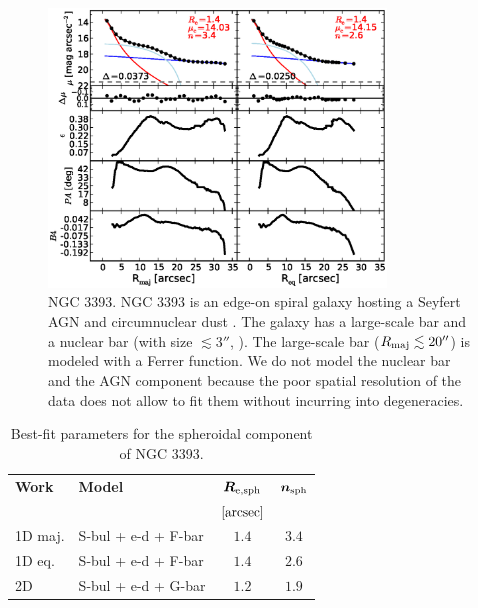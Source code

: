 \documentclass[preprint2]{emulateapj}
\newcommand{\fitfigurewidth}{0.8\textwidth}
\begin{document}
  \begin{figure}[h]
  \begin{center}
  \includegraphics[width=\fitfigurewidth]{images/n3393_1Dfit.eps}
  \caption{NGC 3393.
  NGC 3393 is an edge-on spiral galaxy hosting a Seyfert AGN \citep{diaz1988n3393} and 
  circumnuclear dust \citep{martini2003}.
  The galaxy has a large-scale bar and a nuclear bar (with size $\lesssim 3''$, \citealt{erwin2004}).  
  The large-scale bar ($R_{\rm maj} \lesssim 20''$) is modeled with a Ferrer function.
  We do not model the nuclear bar and the AGN component because the poor spatial resolution of the data does not allow to fit them 
  without incurring into degeneracies.
  }
  \end{center}
  \end{figure}

  \begin{table}[h]
  \small
  \caption{Best-fit parameters for the spheroidal component of NGC 3393.}
  \begin{center}
  \begin{tabular}{llcc}
  \hline
  {\bf Work} & {\bf Model}   & $\bm R_{\rm e,sph}$    & $\bm n_{\rm sph}$ \\
    &  &  $[\rm arcsec]$ & \\
  \hline
  1D maj. & S-bul + e-d + F-bar & $1.4$  &  $3.4$ \\
  1D eq.  & S-bul + e-d + F-bar & $1.4$  &  $2.6$ \\
  2D      & S-bul + e-d + G-bar & $1.2$  &  $1.9$ \\
  \hline
  \end{tabular}
  \end{center}
  \label{tab:n3393}
  \end{table}
\end{document}
